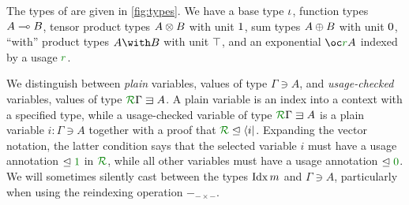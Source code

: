 \documentclass[submission,copyright,creativecommons]{eptcs}
\begin{document}
The types of \name{} are given in \autoref{fig:types}.
We have a base type $\iota$, function types $A \multimap B$, tensor product types
$A \otimes B$ with unit $1$, sum types $A \oplus B$ with unit
$0$, ``with'' product types $\withT A B$ with unit $\top$, and an
exponential $\excl{r} A$ indexed by a usage $\rescomment{r}$.

We distinguish between \emph{plain} variables, values of type
$\Gamma \ni A$, and \emph{usage-checked} variables, values of type
$\ctx{\Gamma}{R} \lvar A$.
A plain variable is an index into a context with a specified type, while a
usage-checked variable of type $\ctx{\Gamma}{R} \lvar A$ is a plain variable
$i : \Gamma \ni A$ together with a proof that
$\resctx R \subres \langle i \rvert$.
Expanding the vector notation, the latter
condition says that the selected variable $i$ must have a usage
annotation $\subres \rescomment 1$ in $\resctx{R}$, while all other
variables must have a usage annotation $\subres \rescomment 0$. We
will sometimes silently cast between the types $\operatorname{Idx} m$ and
$\Gamma \ni A$, particularly when using the reindexing operation
${-}_{{-}\times{-}}$.




\end{document}
